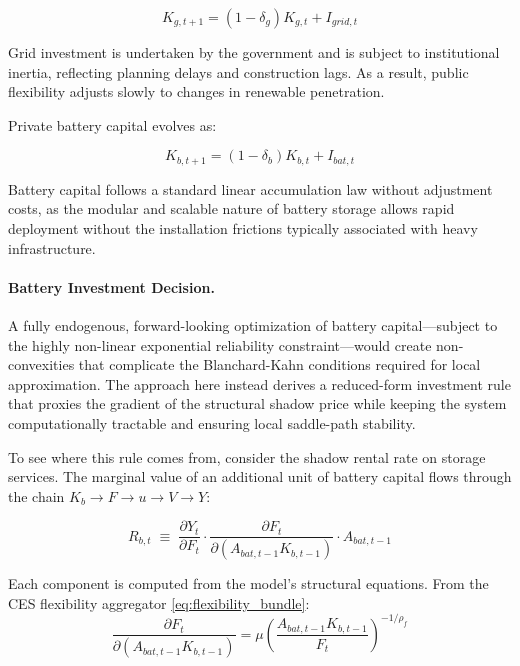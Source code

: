 \documentclass[12pt, a4paper]{article}
\begin{document}
\begin{equation}
K_{g,t+1} = (1-\delta_g)K_{g,t} + I_{grid,t}
\label{eq:grid_capital}
\end{equation}

Grid investment is undertaken by the government and is subject to institutional inertia, reflecting planning delays and construction lags. As a result, public flexibility adjusts slowly to changes in renewable penetration.

Private battery capital evolves as:

\begin{equation}
K_{b,t+1} = (1-\delta_b)K_{b,t} + I_{bat,t}
\label{eq:battery_capital}
\end{equation}

Battery capital follows a standard linear accumulation law without adjustment costs, as the modular and scalable nature of battery storage allows rapid deployment without the installation frictions typically associated with heavy infrastructure.

\paragraph{Battery Investment Decision.}
A fully endogenous, forward-looking optimization of battery capital---subject to the highly non-linear exponential reliability constraint---would create non-convexities that complicate the Blanchard-Kahn conditions required for local approximation. The approach here instead derives a reduced-form investment rule that proxies the gradient of the structural shadow price while keeping the system computationally tractable and ensuring local saddle-path stability.

To see where this rule comes from, consider the shadow rental rate on storage services. The marginal value of an additional unit of battery capital flows through the chain $K_b \to F \to u \to V \to Y$:

\begin{equation}
R_{b,t} \;\equiv\; \frac{\partial Y_t}{\partial F_t} \cdot \frac{\partial F_t}{\partial (A_{bat,t-1} K_{b,t-1})} \cdot A_{bat,t-1}
\label{eq:rental_rate}
\end{equation}

Each component is computed from the model's structural equations. From the CES flexibility aggregator \eqref{eq:flexibility_bundle}:
\begin{equation}
\frac{\partial F_t}{\partial (A_{bat,t-1} K_{b,t-1})} = \mu \left(\frac{A_{bat,t-1} K_{b,t-1}}{F_t}\right)^{-1/\rho_f}
\label{eq:dF_dKb}
\end{equation}
\end{document}
